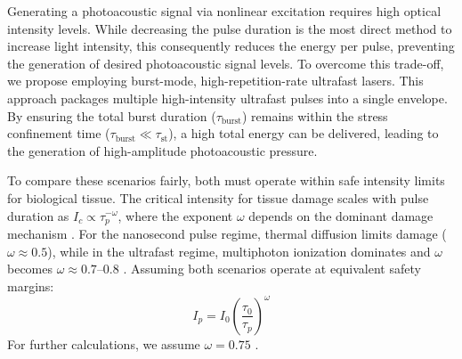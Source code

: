 \documentclass{optica-article}
\begin{document}
Generating a photoacoustic signal via nonlinear excitation requires high optical intensity levels. While decreasing the pulse duration is the most direct method to increase light intensity, this consequently reduces the energy per pulse, preventing the generation of desired photoacoustic signal levels. To overcome this trade-off, we propose employing burst-mode, high-repetition-rate ultrafast lasers. This approach packages multiple high-intensity ultrafast pulses into a single envelope. By ensuring the total burst duration ($\tau_\text{burst}$) remains within the stress confinement time ($\tau_\text{burst} \ll \tau_{\text{st}}$), a high total energy can be delivered, leading to the generation of high-amplitude photoacoustic pressure.

To compare these scenarios fairly, both must operate within safe intensity limits for biological tissue. The critical intensity for tissue damage scales with pulse duration as $I_c \propto \tau_p^{-\omega}$, where the exponent $\omega$ depends on the dominant damage mechanism \cite{Stuart1996LaserBreakdown, Vogel2007}. For the nanosecond pulse regime, thermal diffusion limits damage ($\omega \approx 0.5$), while in the ultrafast regime, multiphoton ionization dominates and $\omega$ becomes $\omega \approx 0.7$--0.8 \cite{Giguere2007, Sun2007CornealAblation}. Assuming both scenarios operate at equivalent safety margins:
\begin{equation}
I_p = I_0 \left(\frac{\tau_0}{\tau_p}\right)^\omega
\label{eq:intensity_scaling}
\end{equation}
For further calculations, we assume $\omega = 0.75$ \cite{Giguere2007}.
\end{document}
